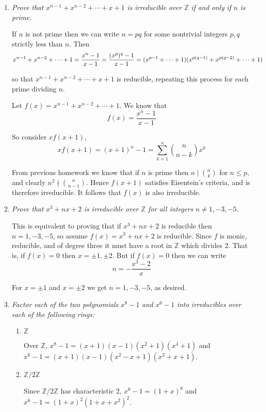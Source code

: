 \documentclass[10pt]{article}
\newcommand{\Z}{\mathbb{Z}}
\begin{document}
\begin{enumerate}
\item \emph{Prove that $x^{n-1} + x^{n-2} + \cdots + x + 1$ is irreducible over $\Z$ if and only if $n$ is prime.}

If $n$ is not prime then we can write $n = pq$ for some nontrivial integers $p,q$ strictly less than $n$.  Then
\[
x^{n-1} + x^{n-2} + \cdots + 1 = {x^n - 1 \over x-1} = {(x^p)^q - 1 \over x-1} = (x^{p-1} + \cdots + 1)(x^{p(q-1)} + x^{p(q-2)} + \cdots + 1)
\]

so that $x^{n-1} + x^{n-2} + \cdots + x + 1$ is reducible, repeating this process for each prime dividing $n$.

Let $f(x) = x^{n-1} + x^{n-2} + \cdots + 1$.  We know that
\[
f(x) = \frac{x^n - 1}{x-1}
\]

So consider $xf(x+1)$,
\[
x f(x+1) = (x+1)^n - 1 = \sum_{k=1}^n \binom{n}{n-k} x^k
\]

From previous homework we know that if $n$ is prime then $n \mid \binom{n}{k}$ for $n \leq p$, and clearly $n^2 \nmid \binom{n}{n-1}$.  Hence $f(x+1)$ satisfies Eisentein's criteria, and is therefore irreducible.  It follows that $f(x)$ is also irreducible.



\item \emph{Prove that $x^3 + nx + 2$ is irreducible over $\Z$ for all integers $n \neq 1,-3,-5$.}

This is equivalent to proving that if $x^3+nx+2$ is reducible then $n = 1, -3, -5$, so assume $f(x) = x^3 + nx + 2$ is reducible.  Since $f$ is monic, reducible, and of degree three it must have a root in $\Z$ which divides $2$.  That is, if $f(x) = 0$ then $x = \pm 1, \pm 2$.  But if $f(x) = 0$ then we can write
\[
n = - \frac{x^3-2}{x}
\]

For $x = \pm 1$ and $x = \pm 2$ we get $n = 1, -3, -5$, as desired.

\item \emph{Factor each of the two polynomials $x^8-1$ and $x^6 - 1$ into irreducibles over each of the following rings:}
\begin{enumerate}
\item \emph{$\Z$}

Over $\Z$, $x^8-1 = (x+1)(x-1)(x^2+1)(x^4+1)$ and $x^6 - 1 = (x+1)(x-1)(x^2-x+1)(x^2+x+1)$.

\item \emph{$\Z/2\Z$}

Since $\Z/2\Z$ has characteristic $2$, $x^8 - 1 = (1+x)^8$ and $x^6 - 1 = (1+x)^2(1+x+x^2)^2$.


\end{enumerate}
\end{enumerate}
\end{document}
